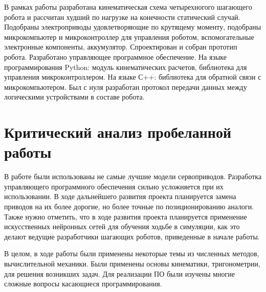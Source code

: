 
В рамках работы разработана кинематическая схема четырехногого шагающего робота и рассчитан худший по нагрузке на конечности статический случай. Подобраны электроприводы удовлетворяющие по крутящему моменту, подобраны микрокомпьютер и микроконтроллер для управления роботом, вспомогательные электронные компоненты, аккумулятор. Спроектирован и собран прототип робота. Разработано управляющее программное обеспечение. На языке программирования Python: модуль кинематических расчетов, библиотека для управления микроконтроллером. На языке С++: библиотека для обратной связи с микрокомпьютером. Был с нуля разработан протокол передачи данных между логическими устройствами в составе робота.

\section*{Критический анализ пробеланной работы}

В работе были использованы не самые лучшие модели сервоприводов. Разработка управляющего программного обеспечения сильно усложняется при их использовании. В ходе дальнейшего развития проекта планируется замена приводов на их более дорогие, но более точные по позиционированию аналоги. Также нужно отметить, что в ходе развития проекта планируется применение искусственных нейронных сетей для обучения ходьбе в симуляции, как это делают ведущие разработчики шагающих роботов, приведенные в начале работы.

В целом, в ходе работы были применены некоторые темы из численных методов, вычислительной механики. Были применены основы кинематики, тригонометрии, для решения возникших задач. Для реализации ПО были изучены многие сложные вопросы касающиеся программирования.